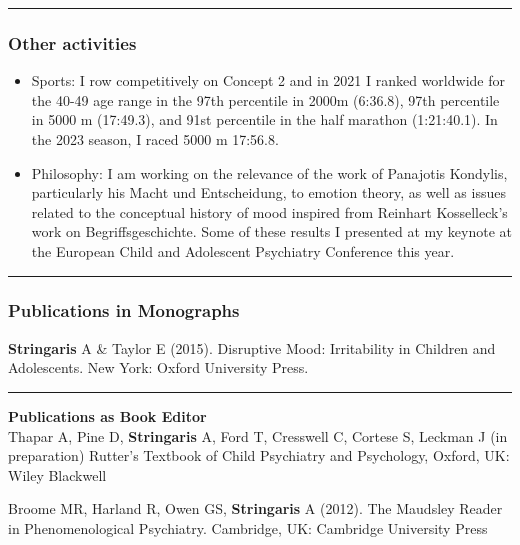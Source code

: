 \documentclass[
]{article}
\begin{document}
\begin{center}\rule{0.5\linewidth}{0.5pt}\end{center}

\hypertarget{other-activities}{%
\subsubsection{Other activities}\label{other-activities}}

\begin{itemize}
\item
  Sports: I row competitively on Concept 2 and in 2021 I ranked
  worldwide for the 40-49 age range in the 97th percentile in 2000m
  (6:36.8), 97th percentile in 5000 m (17:49.3), and 91st percentile in
  the half marathon (1:21:40.1). In the 2023 season, I raced 5000 m
  17:56.8.
\item
  Philosophy: I am working on the relevance of the work of Panajotis
  Kondylis, particularly his Macht und Entscheidung, to emotion theory,
  as well as issues related to the conceptual history of mood inspired
  from Reinhart Kosselleck's work on Begriffsgeschichte. Some of these
  results I presented at my keynote at the European Child and Adolescent
  Psychiatry Conference this year.
\end{itemize}

\begin{center}\rule{0.5\linewidth}{0.5pt}\end{center}

\hypertarget{publications-in-monographs}{%
\subsubsection{Publications in
Monographs}\label{publications-in-monographs}}

\textbf{Stringaris} A \& Taylor E (2015). Disruptive Mood: Irritability
in Children and Adolescents. New York: Oxford University Press.

\begin{center}\rule{0.5\linewidth}{0.5pt}\end{center}

\textbf{Publications as Book Editor}\\
Thapar A, Pine D, \textbf{Stringaris} A, Ford T, Cresswell C, Cortese S,
Leckman J (in preparation) Rutter's Textbook of Child Psychiatry and
Psychology, Oxford, UK: Wiley Blackwell

Broome MR, Harland R, Owen GS, \textbf{Stringaris} A (2012). The
Maudsley Reader in Phenomenological Psychiatry. Cambridge, UK: Cambridge
University Press
\end{document}
